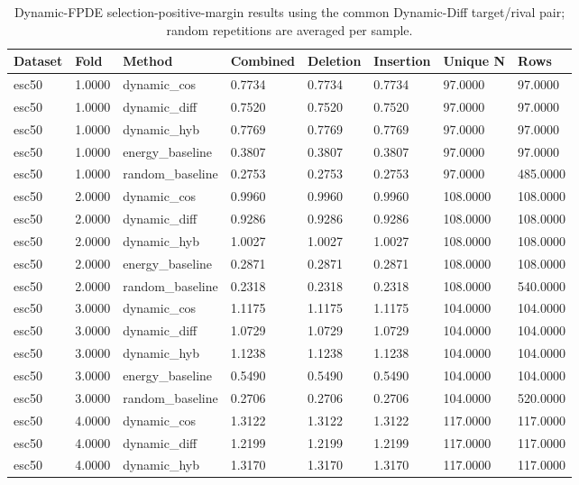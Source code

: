 \begin{table}[htbp]
\centering
\caption{Dynamic-FPDE selection-positive-margin results using the common Dynamic-Diff target/rival pair; random repetitions are averaged per sample.}
\label{tab:dynamic-fpde-positive-margin-results}
\begin{tabular}{llllllll}
\toprule
Dataset & Fold & Method & Combined & Deletion & Insertion & Unique N & Rows \\
\midrule
esc50 & 1.0000 & dynamic\_cos & 0.7734 & 0.7734 & 0.7734 & 97.0000 & 97.0000 \\
esc50 & 1.0000 & dynamic\_diff & 0.7520 & 0.7520 & 0.7520 & 97.0000 & 97.0000 \\
esc50 & 1.0000 & dynamic\_hyb & 0.7769 & 0.7769 & 0.7769 & 97.0000 & 97.0000 \\
esc50 & 1.0000 & energy\_baseline & 0.3807 & 0.3807 & 0.3807 & 97.0000 & 97.0000 \\
esc50 & 1.0000 & random\_baseline & 0.2753 & 0.2753 & 0.2753 & 97.0000 & 485.0000 \\
esc50 & 2.0000 & dynamic\_cos & 0.9960 & 0.9960 & 0.9960 & 108.0000 & 108.0000 \\
esc50 & 2.0000 & dynamic\_diff & 0.9286 & 0.9286 & 0.9286 & 108.0000 & 108.0000 \\
esc50 & 2.0000 & dynamic\_hyb & 1.0027 & 1.0027 & 1.0027 & 108.0000 & 108.0000 \\
esc50 & 2.0000 & energy\_baseline & 0.2871 & 0.2871 & 0.2871 & 108.0000 & 108.0000 \\
esc50 & 2.0000 & random\_baseline & 0.2318 & 0.2318 & 0.2318 & 108.0000 & 540.0000 \\
esc50 & 3.0000 & dynamic\_cos & 1.1175 & 1.1175 & 1.1175 & 104.0000 & 104.0000 \\
esc50 & 3.0000 & dynamic\_diff & 1.0729 & 1.0729 & 1.0729 & 104.0000 & 104.0000 \\
esc50 & 3.0000 & dynamic\_hyb & 1.1238 & 1.1238 & 1.1238 & 104.0000 & 104.0000 \\
esc50 & 3.0000 & energy\_baseline & 0.5490 & 0.5490 & 0.5490 & 104.0000 & 104.0000 \\
esc50 & 3.0000 & random\_baseline & 0.2706 & 0.2706 & 0.2706 & 104.0000 & 520.0000 \\
esc50 & 4.0000 & dynamic\_cos & 1.3122 & 1.3122 & 1.3122 & 117.0000 & 117.0000 \\
esc50 & 4.0000 & dynamic\_diff & 1.2199 & 1.2199 & 1.2199 & 117.0000 & 117.0000 \\
esc50 & 4.0000 & dynamic\_hyb & 1.3170 & 1.3170 & 1.3170 & 117.0000 & 117.0000 \\

\end{tabular}
\end{table}

